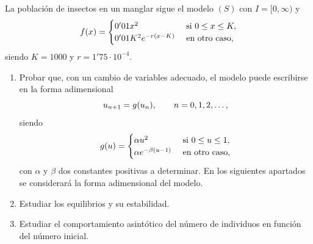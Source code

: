 \documentclass[11pt]{report}
\begin{document}
\begin{exercise}
    La población de insectos en un manglar sigue el modelo $(S)$ con $I = [0,\infty)$ y
    \[f(x) = \begin{cases}
        0'01x^2 & $ si $ 0 \leq x \leq K, \\
        0'01K^2e^{-r(x-K)} & $ en otro caso$,
    \end{cases}\]
    siendo $K = 1000$ y $r = 1'75 \cdot 10^{-4}$.
    \begin{enumerate}
        \item Probar que, con un cambio de variables adecuado, el modelo puede escribirse en la forma adimensional
        \[u_{n+1} = g(u_n), \qquad n = 0,1,2,\mathellipsis,\]
        siendo
        \[g(u) = \begin{cases}
            \alpha u^2 & $ si $ 0 \leq u \leq 1, \\
            \alpha e^{-\beta(u-1)} & $ en otro caso$,
        \end{cases}\]
        con $\alpha$ y $\beta$ dos constantes positivas a determinar. En los siguientes apartados se considerará la forma adimensional del modelo.
        \item Estudiar los equilibrios y su estabilidad.
        \item Estudiar el comportamiento asintótico del número de individuos en función del número inicial.
    \end{enumerate}
\end{exercise}
\end{document}
